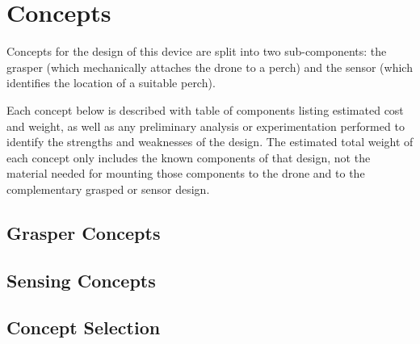 \section{Concepts}
\label{s:concepts}

Concepts for the design of this device are split into two sub-components:
the grasper (which mechanically attaches the drone to a perch) and the sensor 
(which identifies the location of a suitable perch). 

Each concept below is described with table of components listing estimated cost and 
weight, as well as any preliminary analysis or experimentation performed to identify the 
strengths and weaknesses of the design. The estimated total weight of each concept only
includes the known components of that design, not the material needed for mounting those components
to the drone and to the complementary grasped or sensor design.

\subsection{Grasper Concepts}











\subsection{Sensing Concepts}







\subsection{Concept Selection}

